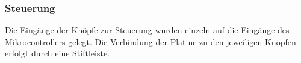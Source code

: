 \subsubsection{Steuerung}
Die Eingänge der Knöpfe zur Steuerung wurden einzeln auf die Eingänge des Mikrocontrollers gelegt. Die Verbindung der Platine zu den jeweiligen Knöpfen erfolgt durch eine Stiftleiste. 